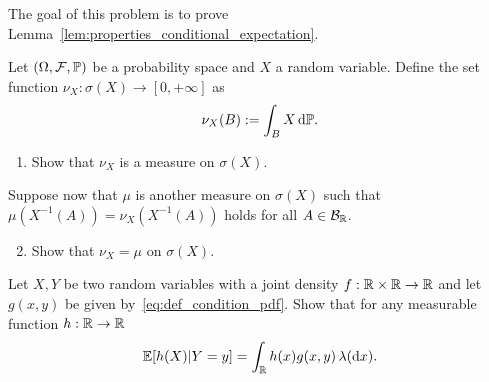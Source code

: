 %

\begin{problem}\label{prb:properties_conditional_expectation}
The goal of this problem is to prove Lemma~\ref{lem:properties_conditional_expectation}.
\end{problem}

\begin{problem}\label{prb:uniqueness_integration_measures}
Let $(\Omega, \mathcal F, \mathbb P)$ be a probability space and $X$ a random variable. Define the set function $\nu_X : \sigma(X) \to [0,+\infty]$ as
\[
	\nu_X(B) := \int_B X \, \mathrm{d} \mathbb P.
\]
\begin{enumerate}[label={(\alph*)}]
\item Show that $\nu_X$ is a measure on $\sigma(X)$.
\end{enumerate}

Suppose now that $\mu$ is another measure on $\sigma(X)$ such that $\mu(X^{-1}(A)) = \nu_X(X^{-1}(A))$ holds for all $A \in \mathcal B_{\mathbb R}$.
\begin{enumerate}[label={(\alph*)}]
\setcounter{enumi}{1}
\item Show that $\nu_X = \mu$ on $\sigma(X)$.
\end{enumerate}
\end{problem}

\begin{problem}
Let $X,Y$ be two random variables with a joint density $f : \mathbb R \times \mathbb R \to \mathbb R$ and let $g(x,y)$ be given by~\eqref{eq:def_condition_pdf}. Show that for any measurable function $h : \mathbb R \to \mathbb R$
\[
	\mathbb E[h(X) | Y = y] = \int_{\mathbb R} h(x) g(x,y) \, \lambda(\mathrm{d} x).
\]
\end{problem}

